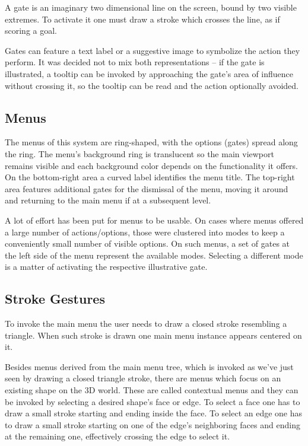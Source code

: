 A gate is an imaginary two dimensional line on the screen, bound by two visible extremes.
To activate it one must draw a stroke which crosses the line, as if scoring a goal.

Gates can feature a text label or a suggestive image to symbolize the action they perform.
It was decided not to mix both representations -- if the gate is illustrated, a tooltip can be invoked
by approaching the gate's area of influence without crossing it, so the tooltip can be read and the action optionally avoided.



\subsection{Menus}

The menus of this system are ring-shaped, with the options (gates) spread along the ring.
The menu's background ring is translucent so the main viewport remains visible and each background color
depends on the functionality it offers.
On the bottom-right area a curved label identifies the menu title.
The top-right area features additional gates for the dismissal of the menu, moving it around and
returning to the main menu if at a subsequent level.

A lot of effort has been put for menus to be usable. On cases where menus offered a large number of actions/options,
those were clustered into modes to keep a conveniently small number of visible options.
On such menus, a set of gates at the left side of the menu represent the available modes.
Selecting a different mode is a matter of activating the respective illustrative gate.





\subsection{Stroke Gestures}

To invoke the main menu the user needs to draw a closed stroke resembling a triangle.
When such stroke is drawn one main menu instance appears centered on it.


Besides menus derived from the main menu tree, which is invoked as we've just seen by drawing a closed triangle stroke,
there are menus which focus on an existing shape on the 3D world.
These are called contextual menus and they can be invoked by selecting a desired shape's face or edge.
To select a face one has to draw a small stroke starting and ending inside the face.
To select an edge one has to draw a small stroke starting on one of the edge's neighboring faces and ending at the remaining one,
effectively crossing the edge to select it.

